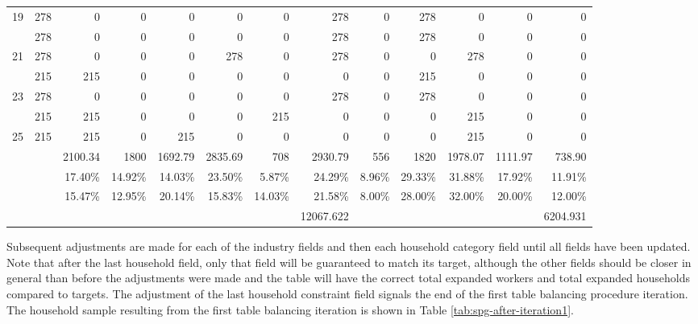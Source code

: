 \begin{sidewaystable}
\begin{tabular}{c*{12}{r}}
19 & 278 & 0 & 0 & 0 & 0 & 0 & 278 & 0 & 278 & 0 & 0 & 0 \\
\gray 20 & 278 & 0 & 0 & 0 & 0 & 0 & 278 & 0 & 278 & 0 & 0 & 0 \\
21 & 278 & 0 & 0 & 0 & 278 & 0 & 278 & 0 & 0 & 278 & 0 & 0 \\
\gray 22 & 215 & 215 & 0 & 0 & 0 & 0 & 0 & 0 & 215 & 0 & 0 & 0 \\
23 & 278 & 0 & 0 & 0 & 0 & 0 & 278 & 0 & 278 & 0 & 0 & 0 \\
\gray 24 & 215 & 215 & 0 & 0 & 0 & 215 & 0 & 0 & 0 & 215 & 0 & 0 \\
25 & 215 & 215 & 0 & 215 & 0 & 0 & 0 & 0 & 0 & 215 & 0 & 0 \\
\hline
 &  & 2100.34 & 1800 & 1692.79 & 2835.69 & 708 & 2930.79 & 556 & 1820 & 1978.07 & 1111.97 & 738.90 \\
 &  & 17.40\% & 14.92\% & 14.03\% & 23.50\% & 5.87\% & 24.29\% & 8.96\% & 29.33\% & 31.88\% & 17.92\% & 11.91\% \\
\rowcolor{yellow!10} \cellcolor{white} & \cellcolor{white} & 15.47\% & 12.95\% & 20.14\% & 15.83\% & 14.03\% & 21.58\% & 8.00\% & 28.00\% & 32.00\% & 20.00\% & 12.00\% \\
 &  &  &  &  &  &  & 12067.622 &  &  &  &  & 6204.931 \\
\hline
\end{tabular}
\end{sidewaystable}

Subsequent adjustments are made for each of the industry fields and then each household category field until all fields have been updated. Note that after the last household field, only that field will be guaranteed to match its target, although the other fields should be closer in general than before the adjustments were made and the table will have the correct total expanded workers and total expanded households compared to targets. The adjustment of the last household constraint field signals the end of the first table balancing procedure iteration. The household sample resulting from the first table balancing iteration is shown in Table \ref{tab:spg-after-iteration1}.


